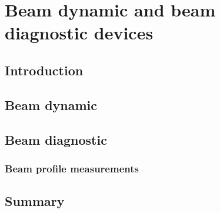 \chapter{Beam dynamic and beam diagnostic devices}
\cleardoublepage

\minitoc
\section{Introduction}
\begin{refsection}
	\label{ch2:Introduction}

	\section{Beam dynamic}
	\section{Beam diagnostic}
	\subsection{Beam profile measurements}

	\section{Summary}
	\label{ch2:Summary}
	\printbibliography[heading=subbibliography]
\end{refsection}